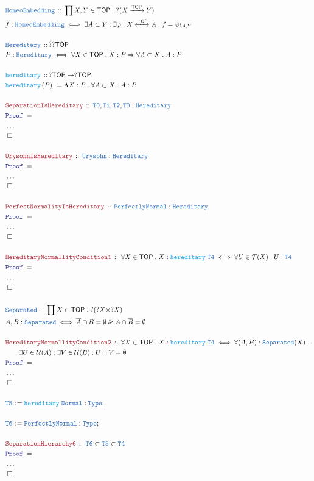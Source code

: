 \documentclass[12pt]{scrartcl}
\newcommand{\TYPE}[1]{\textcolor{NavyBlue}{\mathtt{#1}}}
\newcommand{\FUNC}[1]{\textcolor{Cerulean}{\mathtt{#1}}}
\newcommand{\LOGIC}[1]{\textcolor{Blue}{\mathtt{#1}}}
\newcommand{\THM}[1]{\textcolor{Maroon}{\mathtt{#1}}}
\renewcommand{\.}{\; . \;}
\newcommand{\de}{: \kern 0.1pc =}
\newcommand{\Act}[1]{\left( #1 \right)}
\newcommand{\Theorem}[2]{& \THM{#1} \, :: \, #2 \\ & \Proof = \\ }
\newcommand{\DeclareType}[2]{& \TYPE{#1} \, :: \, #2 \\}
\newcommand{\DefineType}[3]{& #1 : \TYPE{#2} \iff #3 \\}
\newcommand{\DeclareFunc}[2]{& \FUNC{#1} \, :: \, #2 \\}
\newcommand{\DefineFunc}[3]{&  \FUNC{#1}\Act{#2} \de #3 \\}
\newcommand{\NewLine}{\\ & \kern 1pc}
\newcommand{\Page}[1]{ \begin{align*} #1 \end{align*}   }
\newcommand{\NoProof}{ & \ldots \\ \EndProof}
\renewcommand{\And}{\; \& \;}
\newcommand{\Imply}{\Rightarrow}
\newcommand{\Type}{\TYPE{Type}}
\newcommand{\ToIso}{\xleftrightarrow}
\newcommand{\Arrow}{\xrightarrow}
\newcommand{\Conclude}[3]{& #1 \de #2 : #3; \\}
\newcommand{\QED}{\; \square}
\newcommand{\EndProof}{& \QED \\}
\newcommand{\Proof}{\LOGIC{Proof} \; }
\newcommand{\PN}{\TYPE{PerfectlyNormal}}
\newcommand{\TOP}{\mathsf{TOP}}
\newcommand{\T}{\mathcal{T}}
\renewcommand{\U}{\mathcal{U}}
\begin{document}
\Page{
	\DeclareType{HomeoEmbedding}
	{
		\prod X,Y \in \TOP \.
		?( X \Arrow{\TOP} Y   )
	}
	\DefineType{f}{HomeoEmbedding}
	{ 
		\exists A \subset Y : 
		\exists \varphi : X \ToIso{\TOP} A \.   
		f = \varphi \iota_{A,Y}
	}
	\\
	\DeclareType{Hereditary}{??\TOP}
	\DefineType{P}{Hereditary}{\forall X \in \TOP \. X : P \Imply \forall A \subset X \. A : P}
	\\
	\DeclareFunc{hereditary}{?\TOP \to ?\TOP}
	\DefineFunc{hereditary}{P}{\Lambda X : P \. \forall A \subset X \. A : P}
	\\
	\Theorem{SeparationIsHereditary}{\TYPE{T0},\TYPE{T1},\TYPE{T2},\TYPE{T3} : \TYPE{Hereditary}}
	\NoProof
	\\
	\Theorem{UrysohnIsHereditary}{\TYPE{Urysohn} : \TYPE{Hereditary}}
	\NoProof
	\\
	\Theorem{PerfectNormalityIsHereditary}{\PN : \TYPE{Hereditary}}
	\NoProof
	\\
	\Theorem{HereditaryNormallityCondition1}
	{
		\forall X \in \TOP \.
		X : \FUNC{hereditary} \; \TYPE{T4} \iff
		\forall U \in \T(X) \. U : \TYPE{T4}
	}
	\NoProof
	\\
	\DeclareType{Separated}{\prod X \in \TOP \. ?(?X \times ?X)}
	\DefineType{A,B}{Separated}{\overline{A} \cap B = \emptyset \And A \cap \overline{B} = \emptyset}
	\\
	\Theorem{HereditaryNormallityCondition2}
	{
		\forall X \in \TOP \.
		X : \FUNC{hereditary} \; \TYPE{T4} \iff
		\forall (A, B) : \TYPE{Separated}(X) \. \NewLine \. 
		\exists U \in \U(A) :
		\exists V \in \U(B) :
		U \cap V = \emptyset
	}
	\NoProof
	\\
	\Conclude{\TYPE{T5}}{\FUNC{hereditary}\;\TYPE{Normal}}{\Type}
	\\
	\Conclude{\TYPE{T6}}{\PN}{\Type}
	\\
	\Theorem{SeparationHierarchy6}{\TYPE{T6} \subset \TYPE{T5} \subset \TYPE{T4}}
	\NoProof
}
\end{document}

